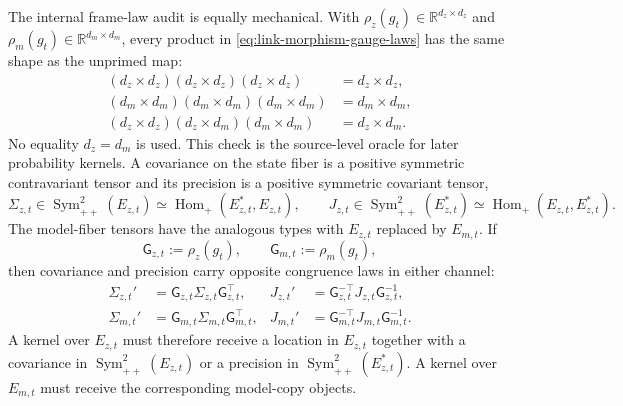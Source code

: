 The internal frame-law audit is equally mechanical. With $\rho_z(g_t)\in\mathbb R^{d_z\times d_z}$ and $\rho_m(g_t)\in\mathbb R^{d_m\times d_m}$, every product in \cref{eq:link-morphism-gauge-laws} has the same shape as the unprimed map:
\begin{equation}
\begin{aligned}
(d_z\times d_z)(d_z\times d_z)(d_z\times d_z)&=d_z\times d_z,\\
(d_m\times d_m)(d_m\times d_m)(d_m\times d_m)&=d_m\times d_m,\\
(d_z\times d_z)(d_z\times d_m)(d_m\times d_m)&=d_z\times d_m.
\end{aligned}
\label{eq:gauge-law-dimension-oracle}
\end{equation}
No equality $d_z=d_m$ is used.  This check is the source-level oracle for later probability kernels.  A covariance on the state fiber is a positive symmetric contravariant tensor and its precision is a positive symmetric covariant tensor,
\begin{equation}
\Sigma_{z,t}\in\operatorname{Sym}^{2}_{++}(E_{z,t})
\simeq\operatorname{Hom}_{+}(E_{z,t}^{*},E_{z,t}),
\qquad
J_{z,t}\in\operatorname{Sym}^{2}_{++}(E_{z,t}^{*})
\simeq\operatorname{Hom}_{+}(E_{z,t},E_{z,t}^{*}).
\label{eq:state-covariance-precision-types}
\end{equation}
The model-fiber tensors have the analogous types with $E_{z,t}$ replaced by $E_{m,t}$.  If
\begin{equation}
\mathsf G_{z,t}:=\rho_z(g_t),
\qquad
\mathsf G_{m,t}:=\rho_m(g_t),
\label{eq:fiber-coordinate-change-matrices}
\end{equation}
then covariance and precision carry opposite congruence laws in either channel:
\begin{equation}
\begin{aligned}
\Sigma_{z,t}'&=\mathsf G_{z,t}\Sigma_{z,t}\mathsf G_{z,t}^{\top},
&J_{z,t}'&=\mathsf G_{z,t}^{-\top}J_{z,t}\mathsf G_{z,t}^{-1},\\
\Sigma_{m,t}'&=\mathsf G_{m,t}\Sigma_{m,t}\mathsf G_{m,t}^{\top},
&J_{m,t}'&=\mathsf G_{m,t}^{-\top}J_{m,t}\mathsf G_{m,t}^{-1}.
\end{aligned}
\label{eq:covariance-precision-opposite-congruence}
\end{equation}
A kernel over $E_{z,t}$ must therefore receive a location in $E_{z,t}$ together with a covariance in $\operatorname{Sym}^{2}_{++}(E_{z,t})$ or a precision in $\operatorname{Sym}^{2}_{++}(E_{z,t}^{*})$. A kernel over $E_{m,t}$ must receive the corresponding model-copy objects.

